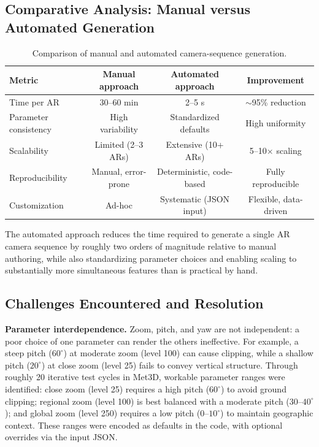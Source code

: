 \documentclass[journal abbreviation, manuscript]{copernicus}
\begin{document}
\subsection{Comparative Analysis: Manual versus Automated Generation}

\begin{table}[htbp]
\centering
\caption{Comparison of manual and automated camera-sequence generation.}
\label{tab:manual-vs-automated}
\begin{tabular}{lccc}
\hline
\textbf{Metric} & \textbf{Manual approach} & \textbf{Automated approach} & \textbf{Improvement} \\
\hline
Time per AR & 30--60 min & 2--5 s & $\sim$95\% reduction \\
Parameter consistency & High variability & Standardized defaults & High uniformity \\
Scalability & Limited (2--3 ARs) & Extensive (10+ ARs) & 5--10$\times$ scaling \\
Reproducibility & Manual, error-prone & Deterministic, code-based & Fully reproducible \\
Customization & Ad-hoc & Systematic (JSON input) & Flexible, data-driven \\
\hline
\end{tabular}
\end{table}

The automated approach reduces the time required to generate a single AR camera sequence by roughly two orders of magnitude relative to manual authoring, while also standardizing parameter choices and enabling scaling to substantially more simultaneous features than is practical by hand.

\subsection{Challenges Encountered and Resolution}

\textbf{Parameter interdependence.} Zoom, pitch, and yaw are not independent: a poor choice of one parameter can render the others ineffective. For example, a steep pitch ($60^{\circ}$) at moderate zoom (level 100) can cause clipping, while a shallow pitch ($20^{\circ}$) at close zoom (level 25) fails to convey vertical structure. Through roughly 20 iterative test cycles in Met3D, workable parameter ranges were identified: close zoom (level 25) requires a high pitch ($60^{\circ}$) to avoid ground clipping; regional zoom (level 100) is best balanced with a moderate pitch ($30$--$40^{\circ}$); and global zoom (level 250) requires a low pitch ($0$--$10^{\circ}$) to maintain geographic context. These ranges were encoded as defaults in the code, with optional overrides via the input JSON.
\end{document}
